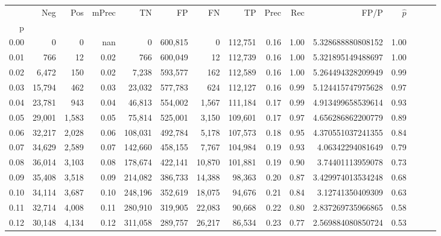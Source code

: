 \begin{tabular}{rrrrrrrrrrrrrrr}
\toprule
{} &     Neg &    Pos & mPrec &       TN &       FP &       FN &       TP &  Prec &   Rec &                    FP/P & $\hat{p}$ \\
p    &         &        &       &          &          &          &          &       &       &                         &           \\
\midrule
0.00 &       0 &      0 &   nan &        0 &  600,815 &        0 &  112,751 &  0.16 &  1.00 &       5.328688880808152 &      1.00 \\
0.01 &     766 &     12 &  0.02 &      766 &  600,049 &       12 &  112,739 &  0.16 &  1.00 &       5.321895149488697 &      1.00 \\
0.02 &   6,472 &    150 &  0.02 &    7,238 &  593,577 &      162 &  112,589 &  0.16 &  1.00 &       5.264494328209949 &      0.99 \\
0.03 &  15,794 &    462 &  0.03 &   23,032 &  577,783 &      624 &  112,127 &  0.16 &  0.99 &       5.124415747975628 &      0.97 \\
0.04 &  23,781 &    943 &  0.04 &   46,813 &  554,002 &    1,567 &  111,184 &  0.17 &  0.99 &       4.913499658539614 &      0.93 \\
0.05 &  29,001 &  1,583 &  0.05 &   75,814 &  525,001 &    3,150 &  109,601 &  0.17 &  0.97 &       4.656286862200779 &      0.89 \\
0.06 &  32,217 &  2,028 &  0.06 &  108,031 &  492,784 &    5,178 &  107,573 &  0.18 &  0.95 &       4.370551037241355 &      0.84 \\
0.07 &  34,629 &  2,589 &  0.07 &  142,660 &  458,155 &    7,767 &  104,984 &  0.19 &  0.93 &        4.06342294081649 &      0.79 \\
0.08 &  36,014 &  3,103 &  0.08 &  178,674 &  422,141 &   10,870 &  101,881 &  0.19 &  0.90 &        3.74401113959078 &      0.73 \\
0.09 &  35,408 &  3,518 &  0.09 &  214,082 &  386,733 &   14,388 &   98,363 &  0.20 &  0.87 &       3.429974013534248 &      0.68 \\
0.10 &  34,114 &  3,687 &  0.10 &  248,196 &  352,619 &   18,075 &   94,676 &  0.21 &  0.84 &        3.12741350409309 &      0.63 \\
0.11 &  32,714 &  4,008 &  0.11 &  280,910 &  319,905 &   22,083 &   90,668 &  0.22 &  0.80 &       2.837269735966865 &      0.58 \\
0.12 &  30,148 &  4,134 &  0.12 &  311,058 &  289,757 &   26,217 &   86,534 &  0.23 &  0.77 &       2.569884080850724 &      0.53 \\

\end{tabular}
